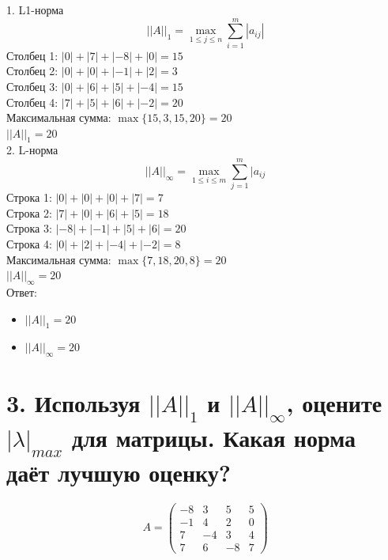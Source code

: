 \documentclass[a4paper,14pt]{article}
\begin{document}
1. L1-норма
$$
||A||_{1} = \max\limits_{1 \leq j \leq n} \sum_{i=1}^m|a_{ij}|
$$
Столбец 1: $|0| + |7| + |-8| + |0| = 15$\\
Столбец 2: $|0| + |0| + |-1| + |2| = 3$\\
Столбец 3: $|0| + |6| + |5| + |-4| = 15$\\
Столбец 4: $|7|+|5|+|6|+|-2|=20$\\
Максимальная сумма: $\max\{15, 3, 15, 20\} = 20$\\
$||A||_{1} = 20$\\

2. L-норма
$$
||A||_{\infty} = \max\limits_{1 \leq i \leq m} \sum_{j=1}^m|a_{ij}
$$
Строка 1: $|0|+|0|+|0|+|7| = 7$\\
Строка 2: $|7|+|0|+|6|+|5| = 18$\\
Строка 3: $|-8|+|-1|+|5|+|6|=20$\\
Строка 4: $|0|+|2|+|-4|+|-2|=8$\\
Максимальная сумма: $\max\{7, 18, 20, 8\} = 20$\\
$||A||_{\infty}=20$\\

Ответ:
\begin{itemize}
	\item $||A||_{1} = 20$
	\item $||A||_{\infty}=20$
\end{itemize}

\section{3.  Используя $||A||_{1}$ и $||A||_{\infty}$, оцените $|\lambda|_{max}$ для матрицы. Какая норма даёт лучшую оценку?}
$$
A = \begin{pmatrix}
-8 & 3 & 5 & 5 \\
-1 & 4 & 2 & 0 \\
7 & -4 & 3 & 4 \\
7 & 6 & -8 & 7
\end{pmatrix}
$$
\end{document}
